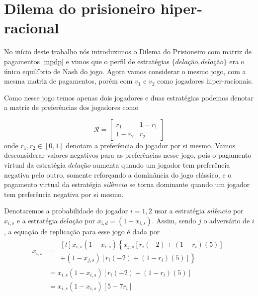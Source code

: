 \chapter{Dilema do prisioneiro hiper-racional}

No início deste trabalho nós introduzimos o Dilema do Prisioneiro com matriz de pagamentos \ref{mpdp} e vimos que o perfil de estratégias $\{\textit{delação},\textit{delação}\}$ era o único equilíbrio de Nash do jogo. Agora vamos considerar o mesmo jogo, com a mesma matriz de pagamentos, porém com $v_1$ e $v_2$ como jogadores hiper-racionais.

Como nesse jogo temos apenas dois jogadores e duas estratégias podemos denotar a matriz de preferências dos jogadores como

\begin{equation}
    \label{matrizPrefPD}
    \mathcal{R}=
    \begin{bmatrix}
        r_1 & 1-r_1\\ 
        1-r_2 & r_2 
    \end{bmatrix}
\end{equation}
onde $r_1,r_2\in[0,1]$ denotam a preferência do jogador por si mesmo. Vamos desconsiderar valores negativos para as preferências nesse jogo, pois o pagamento virtual da estratégia $\textit{delação}$ aumenta quando um jogador tem preferência negativa pelo outro, somente reforçando a dominância do jogo clássico, e o pagamento virtual da estratégia $\textit{silêncio}$ se torna dominante quando um jogador tem preferência negativa por si mesmo. 

Denotaremos a probabilidade do jogador $i=1,2$ usar a estratégia $\textit{silêncio}$ por $x_{i,s}$ e a estratégia $\textit{delação}$ por $x_{i,d}=(1-x_{i,s})$. Assim, sendo $j$ o adversário de $i$, a equação de replicação para esse jogo é dada por
\begin{equation}
\begin{split}
    \label{eqRepPDHREx}
    \dot{x}_{i,s}&= \!\begin{multlined}[t]
    x_{i,s}(1-x_{i,s})\left\{x_{j,s}\left[r_i(-2)+(1-r_i)(5)\right]\right.\\
    + \left. (1-x_{j,s})\left[r_i(-2)+(1-r_i)(5)\right] \right\}
    \end{multlined} \\
    &= x_{i,s}(1-x_{i,s})\left[ r_i(-2)+(1-r_i)(5) \right] \\
    &= x_{i,s}(1-x_{i,s})\left[ 5-7r_i \right]
\end{split}
\end{equation}

